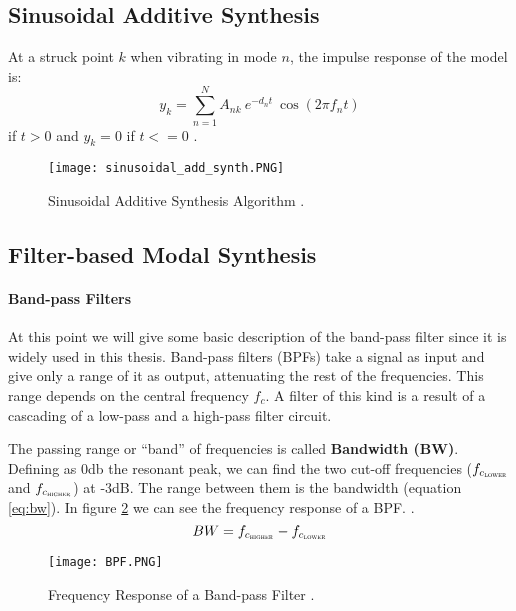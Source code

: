 \subsection{Sinusoidal Additive Synthesis}\label{sec:sin_synth}
At a struck point $k$ when vibrating in mode $n$, the impulse response of the model is:
\begin{equation}\label{eq:modal_response}
y_k = \sum\limits_{n=1}^{N} A_{nk}\ e^{-d_n t}\ \cos(2 \pi f_nt)
\end{equation}
if $t>0$ and $y_k = 0$ if $t<=0$ \cite{van2001foleyautomatic}.

\begin{figure}[H]
  \centering
    \texttt{[image: sinusoidal\_add\_synth.PNG]}
      \caption{Sinusoidal Additive Synthesis Algorithm \cite{Cook:2002:RSS:515316}.}
      \label{fig:sin_add_synth}
\end{figure}

\subsection{Filter-based Modal Synthesis}\label{sec:add_synth}

\paragraph{Band-pass Filters\\}\label{par:bpf}

At this point we will give some basic description of the band-pass filter since it is widely used in this thesis. Band-pass filters (BPFs) take a signal as input and give only a range of it as output, attenuating the rest of the frequencies. This range depends on the central frequency $f_c$. A filter of this kind is a result of a cascading of a low-pass and a high-pass filter circuit.

The passing range or ``band'' of frequencies is called \textbf{Bandwidth (BW)}. Defining as 0db the resonant peak, we can find the two cut-off frequencies ($f_{c{_\textsc{lower}}}$ and $f_{c_{\textsc{higher}}}$) at -3dB. The range between them is the bandwidth (equation \ref{eq:bw}). In figure \ref{fig:resp_bpf} we can see the frequency response of a BPF. \cite{bib:bpf}. 
\begin{equation}\label{eq:bw}
BW = f_{c_{\textsc{higher}}}-f_{c_{\textsc{lower}}}
\end{equation}   

\begin{figure}[H]
  \centering
    \texttt{[image: BPF.PNG]}
      \caption{Frequency Response of a Band-pass Filter  \cite{bib:bpf}.}
      \label{fig:resp_bpf}
\end{figure}

